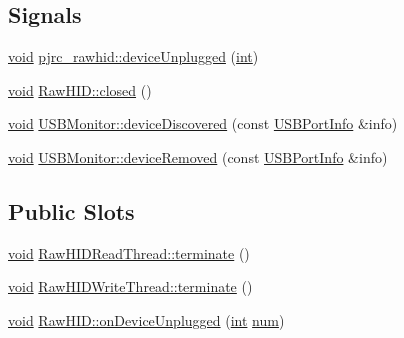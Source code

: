 \subsection*{Signals}
\begin{DoxyCompactItemize}
\item 
\hyperlink{group___u_a_v_objects_plugin_ga444cf2ff3f0ecbe028adce838d373f5c}{void} \hyperlink{group___raw_h_i_d_plugin_ga214c3f073c411ac80306d36644715d8c}{pjrc\-\_\-rawhid\-::device\-Unplugged} (\hyperlink{ioapi_8h_a787fa3cf048117ba7123753c1e74fcd6}{int})
\item 
\hyperlink{group___u_a_v_objects_plugin_ga444cf2ff3f0ecbe028adce838d373f5c}{void} \hyperlink{group___raw_h_i_d_plugin_ga4ababcef71544d260177e4957426598c}{Raw\-H\-I\-D\-::closed} ()
\item 
\hyperlink{group___u_a_v_objects_plugin_ga444cf2ff3f0ecbe028adce838d373f5c}{void} \hyperlink{group___raw_h_i_d_plugin_gab2f32b160f38299dd97b8bce113ac016}{U\-S\-B\-Monitor\-::device\-Discovered} (const \hyperlink{struct_u_s_b_port_info}{U\-S\-B\-Port\-Info} \&info)
\item 
\hyperlink{group___u_a_v_objects_plugin_ga444cf2ff3f0ecbe028adce838d373f5c}{void} \hyperlink{group___raw_h_i_d_plugin_ga2184059e85771292590afbb9087ee225}{U\-S\-B\-Monitor\-::device\-Removed} (const \hyperlink{struct_u_s_b_port_info}{U\-S\-B\-Port\-Info} \&info)
\end{DoxyCompactItemize}
\subsection*{Public Slots}
\begin{DoxyCompactItemize}
\item 
\hyperlink{group___u_a_v_objects_plugin_ga444cf2ff3f0ecbe028adce838d373f5c}{void} \hyperlink{group___raw_h_i_d_plugin_ga9a2b05a16852317c6f30aa1171b4e605}{Raw\-H\-I\-D\-Read\-Thread\-::terminate} ()
\item 
\hyperlink{group___u_a_v_objects_plugin_ga444cf2ff3f0ecbe028adce838d373f5c}{void} \hyperlink{group___raw_h_i_d_plugin_gaf92ea93cbc5d6c7672f8853d3e761122}{Raw\-H\-I\-D\-Write\-Thread\-::terminate} ()
\item 
\hyperlink{group___u_a_v_objects_plugin_ga444cf2ff3f0ecbe028adce838d373f5c}{void} \hyperlink{group___raw_h_i_d_plugin_ga62bfd16ef26f8f8e8c52ce836b268c71}{Raw\-H\-I\-D\-::on\-Device\-Unplugged} (\hyperlink{ioapi_8h_a787fa3cf048117ba7123753c1e74fcd6}{int} \hyperlink{glext_8h_abb50fc1ead3a02a46fb52daa2045f95c}{num})
\end{DoxyCompactItemize}
